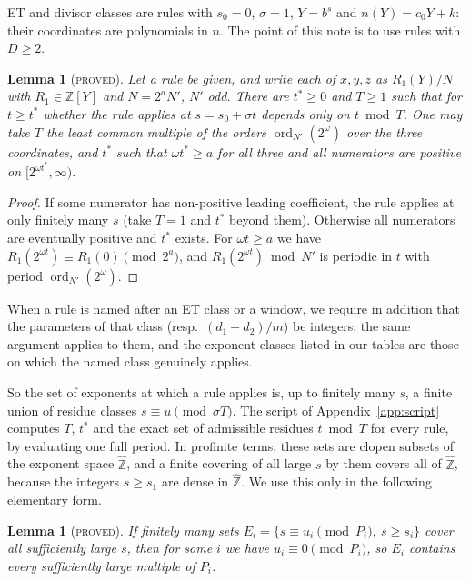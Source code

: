 \documentclass[11pt,reqno]{amsart}
\newtheorem{lemma}[theorem]{Lemma}
\theoremstyle{definition}
\newcommand{\Z}{\mathbb Z}
\newcommand{\Zh}{\widehat{\Z}}
\newcommand{\ord}{\operatorname{ord}}
\newcommand{\status}[1]{\textup{\textsc{#1}}}
\begin{document}
ET and divisor classes are rules with $s_0=0$, $\sigma=1$, $Y=b^s$ and
$n(Y)=c_0Y+k$: their coordinates are polynomials in $n$.  The point of
this note is to use rules with $D\ge2$.

\begin{lemma}[\status{proved}]\label{lem:ruleperiod}
Let a rule be given, and write each of $x,y,z$ as $R_1(Y)/N$ with
$R_1\in\Z[Y]$ and $N=2^aN'$, $N'$ odd.  There are $t^*\ge0$ and $T\ge1$
such that for $t\ge t^*$ whether the rule applies at $s=s_0+\sigma t$
depends only on $t\bmod T$.  One may take $T$ the least common multiple of
the orders $\ord_{N'}(2^\omega)$ over the three coordinates, and $t^*$ such
that $\omega t^*\ge a$ for all three and all numerators are positive on
$[2^{\omega t^*},\infty)$.
\end{lemma}

\begin{proof}
If some numerator has non-positive leading coefficient, the rule applies at
only finitely many $s$ (take $T=1$ and $t^*$ beyond them).  Otherwise all
numerators are eventually positive and $t^*$ exists.  For $\omega t\ge a$ we
have $R_1(2^{\omega t})\equiv R_1(0)\pmod{2^a}$, and
$R_1(2^{\omega t})\bmod N'$ is periodic in $t$ with period
$\ord_{N'}(2^\omega)$.
\end{proof}
When a rule is named after an ET class or a window, we require in addition
that the parameters of that class (resp.\ $(d_1+d_2)/m$) be integers; the
same argument applies to them, and the exponent classes listed in our
tables are those on which the named class genuinely applies.

So the set of exponents at which a rule applies is, up to finitely many
$s$, a finite union of residue classes $s\equiv u\pmod{\sigma T}$.  The
script of Appendix~\ref{app:script} computes $T$, $t^*$ and the exact set of
admissible residues $t\bmod T$ for every rule, by evaluating one full period.
In profinite terms, these sets are clopen subsets of the exponent space
$\Zh$, and a finite covering of all large $s$ by them covers all of $\Zh$,
because the integers $s\ge s_1$ are dense in $\Zh$.  We use this only in the
following elementary form.

\begin{lemma}[\status{proved}]\label{lem:compact}
If finitely many sets $E_i=\{s\equiv u_i\pmod{P_i},\ s\ge s_i\}$ cover all
sufficiently large $s$, then for some $i$ we have $u_i\equiv0\pmod{P_i}$, so
$E_i$ contains every sufficiently large multiple of $P_i$.
\end{lemma}
\end{document}
